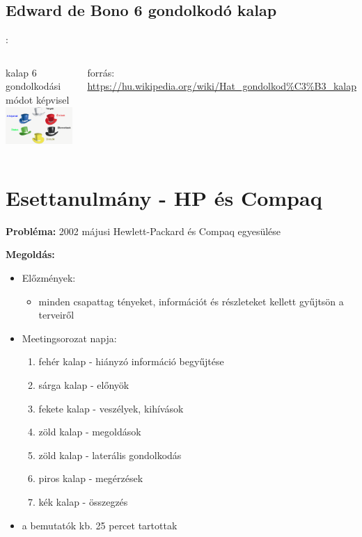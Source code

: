 \documentclass{beamer}
\begin{document}
\subsection{Edward de Bono 6 gondolkodó kalap}
\begin{frame}{\secname : \subsecname}
\begin{columns}
 kalap 6 gondolkodási módot képvisel
\centering
\includegraphics[scale=0.4]{figures/hatkalap.png}

\begin{footnotesize}
forrás: \url{https://hu.wikipedia.org/wiki/Hat_gondolkod\%C3\%B3_kalap}
\end{footnotesize}
\end{columns}
\end{frame}

\section{Esettanulmány - HP és Compaq}
\begin{frame}
\textbf{Probléma:} 2002 májusi Hewlett-Packard és Compaq egyesülése

\textbf{Megoldás:}
\begin{itemize}
    \item Előzmények:
    \begin{itemize}
        \item minden csapattag tényeket, információt és részleteket kellett gyűjtsön a terveiről
    \end{itemize}
    \item Meetingsorozat napja:
    \begin{enumerate}
        \item fehér kalap - hiányzó információ begyűjtése
        \item sárga kalap - előnyök
        \item fekete kalap - veszélyek, kihívások
        \item zöld kalap - megoldások
        \item zöld kalap - laterális gondolkodás
        \item piros kalap - megérzések
        \item kék kalap - összegzés
    \end{enumerate}
    \item a bemutatók kb. 25 percet tartottak
\end{itemize}

\end{frame}
\end{document}
